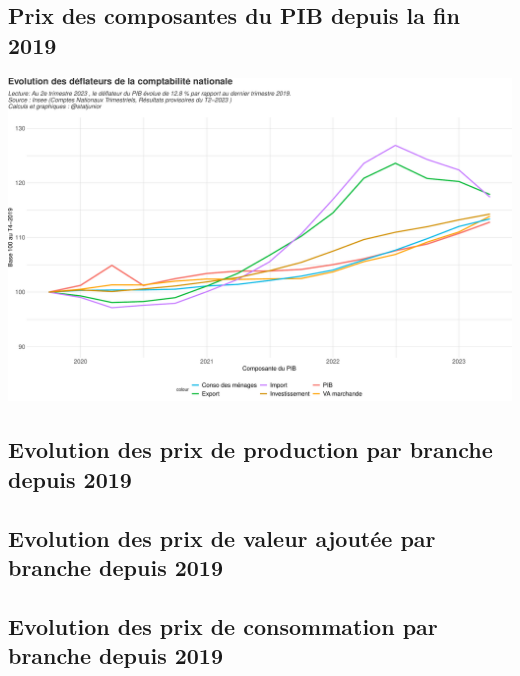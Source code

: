 \documentclass[
  paper=a4,
  ,captions=tableheading
]{scrartcl}
\begin{document}
\hypertarget{prix-des-composantes-du-pib-depuis-la-fin-2019}{%
\subsection{Prix des composantes du PIB depuis la fin
2019}\label{prix-des-composantes-du-pib-depuis-la-fin-2019}}

\includegraphics{rapport_pdf_compte_branche_files/figure-latex/unnamed-chunk-7-1.pdf}

\hypertarget{evolution-des-prix-de-production-par-branche-depuis-2019}{%
\subsection{Evolution des prix de production par branche depuis
2019}\label{evolution-des-prix-de-production-par-branche-depuis-2019}}

\hypertarget{evolution-des-prix-de-valeur-ajoutuxe9e-par-branche-depuis-2019}{%
\subsection{Evolution des prix de valeur ajoutée par branche depuis
2019}\label{evolution-des-prix-de-valeur-ajoutuxe9e-par-branche-depuis-2019}}

\hypertarget{evolution-des-prix-de-consommation-par-branche-depuis-2019}{%
\subsection{Evolution des prix de consommation par branche depuis
2019}\label{evolution-des-prix-de-consommation-par-branche-depuis-2019}}

\newpage
\end{document}
